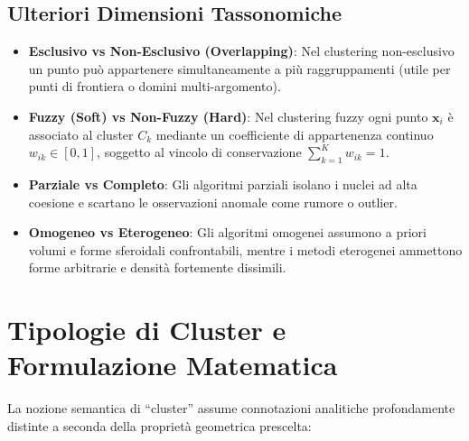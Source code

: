 \subsection{Ulteriori Dimensioni Tassonomiche}
\begin{itemize}
    \item \textbf{Esclusivo vs Non-Esclusivo (Overlapping)}: Nel clustering non-esclusivo un punto può appartenere simultaneamente a più raggruppamenti (utile per punti di frontiera o domini multi-argomento).
    \item \textbf{Fuzzy (Soft) vs Non-Fuzzy (Hard)}: Nel clustering fuzzy ogni punto $\mathbf{x}_i$ è associato al cluster $C_k$ mediante un coefficiente di appartenenza continuo $w_{ik} \in [0, 1]$, soggetto al vincolo di conservazione $\sum_{k=1}^K w_{ik} = 1$.
    \item \textbf{Parziale vs Completo}: Gli algoritmi parziali isolano i nuclei ad alta coesione e scartano le osservazioni anomale come rumore o outlier.
    \item \textbf{Omogeneo vs Eterogeneo}: Gli algoritmi omogenei assumono a priori volumi e forme sferoidali confrontabili, mentre i metodi eterogenei ammettono forme arbitrarie e densità fortemente dissimili.
\end{itemize}

\FloatBarrier
\section{Tipologie di Cluster e Formulazione Matematica}
\label{sec:dm-cluster-types-definitions}

La nozione semantica di ``cluster'' assume connotazioni analitiche profondamente distinte a seconda della proprietà geometrica prescelta:

